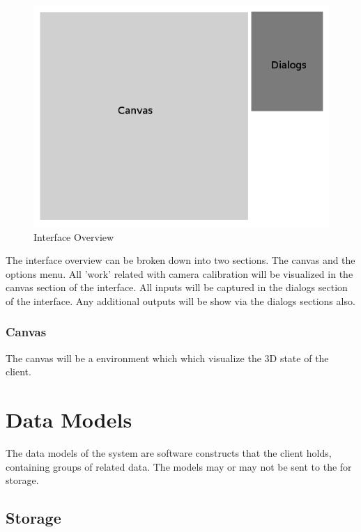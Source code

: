 \documentclass[11pt]{report}
\begin{document}
\begin{figure}[htp]
\centering
\includegraphics[scale=0.45]{images/interface_screen.png}
\caption{Interface Overview}
\label{fig:is}
\end{figure}

The interface overview can be broken down into two sections. The canvas and the options menu. All 'work' related with camera calibration will be visualized in the canvas section of the interface. All inputs will be captured in the dialogs section of the interface. Any additional outputs will be show via the dialogs sections also.

\subsubsection{Canvas}

The canvas will be a  environment which which visualize the 3D state of the client. 

\section{Data Models}

The data models of the system are software constructs that the client holds, containing groups of related data. The models may or may not be sent to the  for storage. 

\subsection{Storage}
\end{document}
